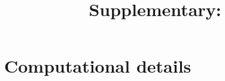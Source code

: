 

\title{Supplementary: \titletext}



    \maketitle

    \section{Computational details}
        \label{sec:computational}
        

    
    

